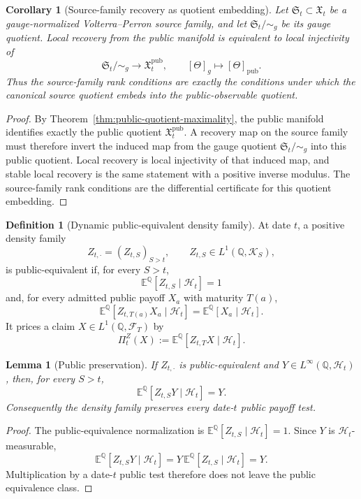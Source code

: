 \documentclass[11pt,a4paper]{amsart}
\theoremstyle{plain}
\newtheorem{lemma}[theorem]{Lemma}
\newtheorem{corollary}[theorem]{Corollary}
\theoremstyle{definition}
\newtheorem{definition}[theorem]{Definition}
\theoremstyle{remark}
\newcommand{\QQ}{\mathbb{Q}}
\newcommand{\EE}{\mathbb{E}}
\newcommand{\cF}{\mathcal{F}}
\newcommand{\cH}{\mathcal{H}}
\newcommand{\cK}{\mathcal{K}}
\begin{document}
\begin{corollary}[Source-family recovery as quotient embedding]\label{cor:source-quotient-embedding}
Let \(\mathfrak S_t\subset\mathfrak X_t\) be a gauge-normalized Volterra--Perron source family,
and let \(\mathfrak S_t/\!\sim_g\) be its gauge quotient.  Local recovery from the public
manifold is equivalent to local injectivity of
\[
        \mathfrak S_t/\!\sim_g
        \longrightarrow
        \mathfrak X_t^{\mathrm{pub}},
        \qquad
        [\Theta]_g\mapsto[\Theta]_{\mathrm{pub}}.
\]
Thus the source-family rank conditions are exactly the conditions under which the canonical
source quotient embeds into the public-observable quotient.
\end{corollary}

\begin{proof}
By Theorem~\ref{thm:public-quotient-maximality}, the public manifold identifies exactly the public
quotient \(\mathfrak X_t^{\mathrm{pub}}\).  A recovery map on the source family must therefore
invert the induced map from the gauge quotient \(\mathfrak S_t/\!\sim_g\) into this public quotient.
Local recovery is local injectivity of that induced map, and stable local recovery is the same
statement with a positive inverse modulus.  The source-family rank conditions are the differential
certificate for this quotient embedding.
\end{proof}


\begin{definition}[Dynamic public-equivalent density family]\label{def:dynamic-public-equivalent}
At date \(t\), a positive density family
\[
        Z_{t,\cdot}=(Z_{t,S})_{S>t},
        \qquad Z_{t,S}\in L^1(\QQ,\cK_S),
\]
is public-equivalent if, for every \(S>t\),
\[
        \EE^\QQ[Z_{t,S}\mid\cH_t]=1
\]
and, for every admitted public payoff \(X_a\) with maturity \(T(a)\),
\[
        \EE^\QQ[Z_{t,T(a)}X_a\mid\cH_t]
        =
        \EE^\QQ[X_a\mid\cH_t].
\]
It prices a claim \(X\in L^1(\QQ,\cF_T)\) by
\[
        \Pi_t^Z(X):=\EE^\QQ[Z_{t,T}X\mid\cH_t].
\]
\end{definition}

\begin{lemma}[Public preservation]\label{lem:public-preservation}
If \(Z_{t,\cdot}\) is public-equivalent and \(Y\in L^\infty(\QQ,\cH_t)\), then, for every
\(S>t\),
\[
        \EE^\QQ[Z_{t,S}Y\mid\cH_t]=Y.
\]
Consequently the density family preserves every date-\(t\) public payoff test.
\end{lemma}

\begin{proof}
The public-equivalence normalization is \(\EE^\QQ[Z_{t,S}\mid\cH_t]=1\).  Since
\(Y\) is \(\cH_t\)-measurable,
\[
        \EE^\QQ[Z_{t,S}Y\mid\cH_t]
        =
        Y\,\EE^\QQ[Z_{t,S}\mid\cH_t]
        =
        Y.
\]
Multiplication by a date-\(t\) public test therefore does not leave the public equivalence class.
\end{proof}
\end{document}
